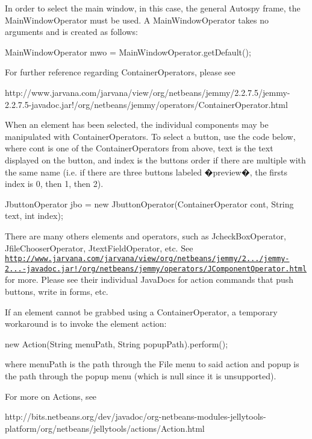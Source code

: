 In order to select the main window, in this case, the general Autospy frame, the Main\+Window\+Operator must be used. A Main\+Window\+Operator takes no arguments and is created as follows\+: \begin{DoxyVerb}MainWindowOperator mwo = MainWindowOperator.getDefault();
\end{DoxyVerb}


For further reference regarding Container\+Operators, please see \begin{DoxyVerb}http://www.jarvana.com/jarvana/view/org/netbeans/jemmy/2.2.7.5/jemmy-2.2.7.5-javadoc.jar!/org/netbeans/jemmy/operators/ContainerOperator.html
\end{DoxyVerb}


When an element has been selected, the individual components may be manipulated with Container\+Operators. To select a button, use the code below, where cont is one of the Container\+Operators from above, text is the text displayed on the button, and index is the button\textquotesingle{}s order if there are multiple with the same name (i.\+e. if there are three buttons labeled �preview�, the first\textquotesingle{}s index is 0, then 1, then 2).

Jbutton\+Operator jbo = new Jbutton\+Operator(\+Container\+Operator cont, String text, int index);

There are many others elements and operators, such as Jcheck\+Box\+Operator, Jfile\+Chooser\+Operator, Jtext\+Field\+Operator, etc. See \href{http://www.jarvana.com/jarvana/view/org/netbeans/jemmy/2.2.7.5/jemmy-2.2.7.5-javadoc.jar!/org/netbeans/jemmy/operators/JComponentOperator.html}{\tt http\+://www.\+jarvana.\+com/jarvana/view/org/netbeans/jemmy/2.../jemmy-\/2...-\/javadoc.\+jar!/org/netbeans/jemmy/operators/\+J\+Component\+Operator.\+html} for more. Please see their individual Java\+Docs for action commands that push buttons, write in forms, etc.

If an element cannot be grabbed using a Container\+Operator, a temporary workaround is to invoke the element action\+: \begin{DoxyVerb}new Action(String menuPath, String popupPath).perform();
\end{DoxyVerb}


where menu\+Path is the path through the File menu to said action and popup is the path through the popup menu (which is null since it is unsupported).

For more on Actions, see \begin{DoxyVerb}http://bits.netbeans.org/dev/javadoc/org-netbeans-modules-jellytools-platform/org/netbeans/jellytools/actions/Action.html\end{DoxyVerb}
 